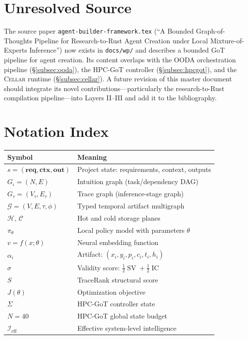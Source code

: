 \documentclass[11pt]{article}
\theoremstyle{remark}
\DeclareMathOperator{\SV}{SV}
\DeclareMathOperator{\IC}{IC}
\newcommand{\req}{\mathbf{req}}
\newcommand{\ctx}{\mathbf{ctx}}
\newcommand{\out}{\mathbf{out}}
\newcommand{\Ieff}{\mathcal{I}_{\mathrm{eff}}}
\newcommand{\graph}{\mathcal{G}}
\newcommand{\hot}{\mathcal{H}}
\newcommand{\cold}{\mathcal{C}}
\newcommand{\cellar}{\textsc{Cellar}}
\begin{document}
\section{Unresolved Source}
\label{app:unresolved}

The source paper \texttt{agent-builder-framework.tex} (``A Bounded Graph-of-Thoughts Pipeline for Research-to-Rust Agent Creation under Local Mixture-of-Experts Inference'') now exists in \texttt{docs/wp/} and describes a bounded GoT pipeline for agent creation. Its content overlaps with the OODA orchestration pipeline (\S\ref{subsec:ooda}), the HPC-GoT controller (\S\ref{subsec:hpcgot}), and the \cellar{} runtime (\S\ref{subsec:cellar}). A future revision of this master document should integrate its novel contributions---particularly the research-to-Rust compilation pipeline---into Layers II--III and add it to the bibliography.

\section{Notation Index}
\label{app:notation}

\begin{longtable}{p{3cm}p{11cm}}
\toprule
\textbf{Symbol} & \textbf{Meaning} \\
\midrule
\endfirsthead
$s = (\req, \ctx, \out)$ & Project state: requirements, context, outputs \\
$G_\iota = (N, E)$ & Intuition graph (task/dependency DAG) \\
$G_\tau = (V_\tau, E_\tau)$ & Trace graph (inference-stage graph) \\
$\graph = (V, E, \tau, \phi)$ & Typed temporal artifact multigraph \\
$\hot$, $\cold$ & Hot and cold storage planes \\
$\pi_\theta$ & Local policy model with parameters $\theta$ \\
$v = f(x; \theta)$ & Neural embedding function \\
$\alpha_i$ & Artifact: $(x_i, y_i, p_i, c_i, t_i, h_i)$ \\
$\sigma$ & Validity score: $\frac{1}{2}\SV + \frac{1}{2}\IC$ \\
$S$ & TraceRank structural score \\
$J(\theta)$ & Optimization objective \\
$\Sigma$ & HPC-GoT controller state \\
$N = 40$ & HPC-GoT global state budget \\
$\Ieff$ & Effective system-level intelligence \\
\bottomrule
\end{longtable}
\end{document}
